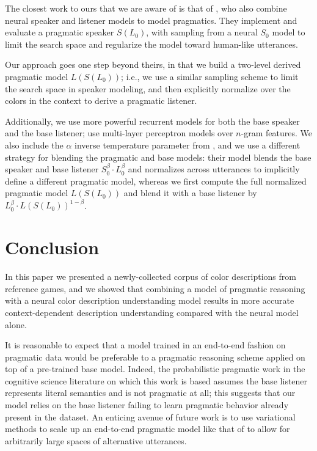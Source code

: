 \documentclass[11pt,letterpaper]{article}
\newcommand{\Listener}{L}
\newcommand{\Speaker}{S}
\renewcommand{\|}{\mid}
\begin{document}
The closest work to ours that we are aware of is that of
, who also combine neural speaker
and listener models to model pragmatics. They implement and evaluate a
pragmatic speaker $\Speaker(\Listener_0)$, with sampling from a neural
$\Speaker_0$ model to limit the search space and regularize the model toward
human-like utterances.

Our approach goes one step beyond theirs, in that we build a two-level derived
pragmatic model $\Listener(\Speaker(\Listener_0))$; i.e., we use a similar sampling
scheme to limit the search space in speaker modeling, and then explicitly normalize
over the colors in the context to derive a pragmatic listener.

Additionally, we use more powerful recurrent models for both the base speaker and the
base listener;  use multi-layer perceptron
models over $n$-gram features. We also include the $\alpha$ inverse temperature
parameter from , and we use a different strategy for blending the
pragmatic and base models: their model blends the base speaker and base listener
$\Speaker_0^{\beta} \cdot \Listener_0^{\beta}$ and
normalizes across utterances to implicitly define a different pragmatic model,
whereas we first compute the full normalized pragmatic
model $\Listener(\Speaker(\Listener_0))$ and blend it with a base listener by
$\Listener_0^{\beta} \cdot \Listener(\Speaker(\Listener_0))^{1 - \beta}$.

\section{Conclusion} \label{sec:conclusion}

In this paper we presented a newly-collected corpus of color descriptions from
reference games, and we showed that combining a model of pragmatic reasoning
with a neural color description understanding model results in more accurate
context-dependent description understanding compared with the neural model alone.

It is reasonable to expect that a model trained in an end-to-end fashion on
pragmatic data would be preferable to a pragmatic reasoning scheme applied on
top of a pre-trained base model.
Indeed, the probabilistic pragmatic work in the cognitive science literature
on which this work is based assumes the base listener represents literal semantics
and is not pragmatic at all; this suggests that our model relies on the base
listener failing to learn pragmatic behavior already present in the dataset.
An enticing avenue of future work is to use variational methods to scale
up an end-to-end pragmatic model like that of  to
allow for arbitrarily large spaces of alternative utterances.
\end{document}
